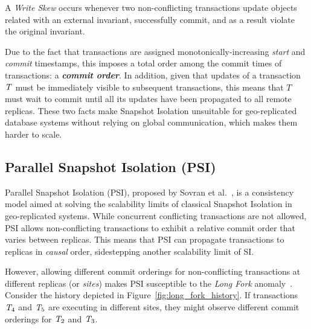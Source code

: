 

\begin{definition}
A \emph{Write Skew} occurs whenever two non-conflicting transactions update objects related with an external invariant, successfully commit, and as a result violate the original invariant.
\end{definition}

Due to the fact that transactions are assigned monotonically-increasing \emph{start} and \emph{commit} timestamps, this imposes a total order among the commit times of transactions: a \textbf{\em commit order}. In addition, given that updates of a transaction $\mathit{T}$ must be immediately visible to subsequent transactions, this means that $T$ must wait to commit until all its updates have been propagated to all remote replicas. These two facts make Snapshot Isolation unsuitable for geo-replicated database systems without relying on global communication, which makes them harder to scale.

\subsection{Parallel Snapshot Isolation (PSI)}
\label{sect:psi}

Parallel Snapshot Isolation (PSI), proposed by Sovran et al.~\citep{psi-intro}, is a consistency model aimed at solving the scalability limits of classical Snapshot Isolation in geo-replicated systems. While
concurrent conflicting transactions are not allowed, PSI allows non-conflicting transactions to exhibit a relative commit order that varies between replicas. This means that PSI can propagate transactions to replicas in \emph{causal} order, sidestepping another scalability limit of SI.

However, allowing different commit orderings for non-conflicting transactions at different replicas (or \emph{sites}) makes PSI susceptible to the \emph{Long Fork} anomaly~\citep{psi-intro}. Consider the history depicted in Figure~\ref{fig:long_fork_history}. If transactions $\mathit{T}_4$ and $\mathit{T}_5$ are executing in different sites, they might observe different commit orderings for $\mathit{T}_2$ and $\mathit{T}_3$.

